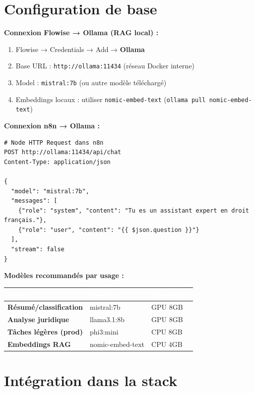\documentclass[11pt, a4paper]{article}
\begin{document}
\section{Configuration de base}

\textbf{Connexion Flowise → Ollama (RAG local) :}
\begin{enumerate}
  \item Flowise → Credentials → Add → \textbf{Ollama}
  \item Base URL : \texttt{http://ollama:11434} (réseau Docker interne)
  \item Model : \texttt{mistral:7b} (ou autre modèle téléchargé)
  \item Embeddings locaux : utiliser \texttt{nomic-embed-text} (\texttt{ollama pull nomic-embed-text})
\end{enumerate}

\textbf{Connexion n8n → Ollama :}
\begin{lstlisting}[style=terminal]
# Node HTTP Request dans n8n
POST http://ollama:11434/api/chat
Content-Type: application/json

{
  "model": "mistral:7b",
  "messages": [
    {"role": "system", "content": "Tu es un assistant expert en droit français."},
    {"role": "user", "content": "{{ $json.question }}"}
  ],
  "stream": false
}
\end{lstlisting}

\textbf{Modèles recommandés par usage :}
\begin{center}
\renewcommand{\arraystretch}{1.4}
\begin{tabularx}{\linewidth}{>{\bfseries}p{3.5cm} p{2.5cm} X}
\toprule
\rowcolor{tabheader}
\textcolor{white}{\textbf{Usage}} & \textcolor{white}{\textbf{Modèle}} & \textcolor{white}{\textbf{Ressources}} \\
\midrule
Résumé/classification & mistral:7b & GPU 8GB \\
\rowcolor{rowgray}
Analyse juridique & llama3.1:8b & GPU 8GB \\
Tâches légères (prod) & phi3:mini & CPU 8GB \\
\rowcolor{rowgray}
Embeddings RAG & nomic-embed-text & CPU 4GB \\
\bottomrule
\end{tabularx}
\end{center}

\section{Intégration dans la stack}
\end{document}
